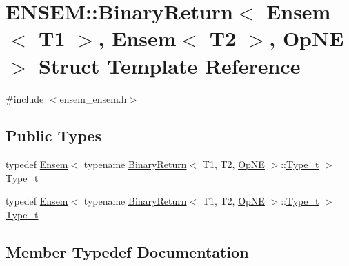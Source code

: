 \hypertarget{structENSEM_1_1BinaryReturn_3_01Ensem_3_01T1_01_4_00_01Ensem_3_01T2_01_4_00_01OpNE_01_4}{}\section{E\+N\+S\+EM\+:\+:Binary\+Return$<$ Ensem$<$ T1 $>$, Ensem$<$ T2 $>$, Op\+NE $>$ Struct Template Reference}
\label{structENSEM_1_1BinaryReturn_3_01Ensem_3_01T1_01_4_00_01Ensem_3_01T2_01_4_00_01OpNE_01_4}


{\ttfamily \#include $<$ensem\+\_\+ensem.\+h$>$}

\subsection*{Public Types}
\begin{DoxyCompactItemize}
\item 
typedef \mbox{\hyperlink{classENSEM_1_1Ensem}{Ensem}}$<$ typename \mbox{\hyperlink{structENSEM_1_1BinaryReturn}{Binary\+Return}}$<$ T1, T2, \mbox{\hyperlink{structENSEM_1_1OpNE}{Op\+NE}} $>$\+::\mbox{\hyperlink{structENSEM_1_1BinaryReturn_3_01Ensem_3_01T1_01_4_00_01Ensem_3_01T2_01_4_00_01OpNE_01_4_a138a0a892edf84683f03f6b723474dae}{Type\+\_\+t}} $>$ \mbox{\hyperlink{structENSEM_1_1BinaryReturn_3_01Ensem_3_01T1_01_4_00_01Ensem_3_01T2_01_4_00_01OpNE_01_4_a138a0a892edf84683f03f6b723474dae}{Type\+\_\+t}}
\item 
typedef \mbox{\hyperlink{classENSEM_1_1Ensem}{Ensem}}$<$ typename \mbox{\hyperlink{structENSEM_1_1BinaryReturn}{Binary\+Return}}$<$ T1, T2, \mbox{\hyperlink{structENSEM_1_1OpNE}{Op\+NE}} $>$\+::\mbox{\hyperlink{structENSEM_1_1BinaryReturn_3_01Ensem_3_01T1_01_4_00_01Ensem_3_01T2_01_4_00_01OpNE_01_4_a138a0a892edf84683f03f6b723474dae}{Type\+\_\+t}} $>$ \mbox{\hyperlink{structENSEM_1_1BinaryReturn_3_01Ensem_3_01T1_01_4_00_01Ensem_3_01T2_01_4_00_01OpNE_01_4_a138a0a892edf84683f03f6b723474dae}{Type\+\_\+t}}
\end{DoxyCompactItemize}


\subsection{Member Typedef Documentation}
\mbox{\label{structENSEM_1_1BinaryReturn_3_01Ensem_3_01T1_01_4_00_01Ensem_3_01T2_01_4_00_01OpNE_01_4_a138a0a892edf84683f03f6b723474dae}} 
